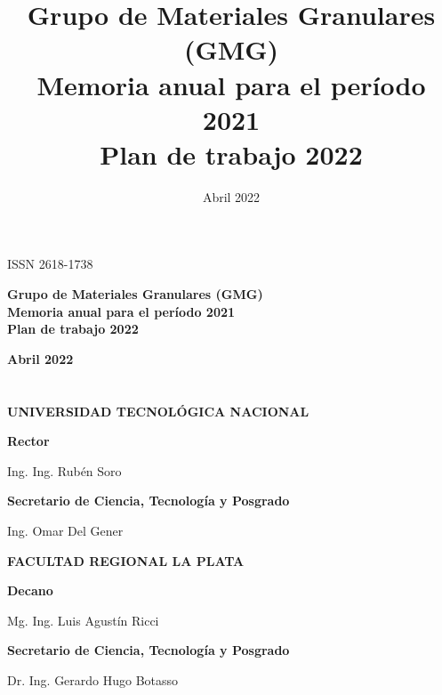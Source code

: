 \documentclass[a4paper,11pt,twoside,final,titlepage,onecolumn,openright]{report}
\begin{document}
\title{Grupo de Materiales Granulares (GMG) \\ Memoria anual para el período 2021 \\ Plan de trabajo 2022}
\date{Abril 2022}


\chapter*{}

\begin{flushright}
 ISSN 2618-1738
\end{flushright}

\vspace{5cm}
\begin{center}

\textbf{\LARGE Grupo de Materiales Granulares (GMG) \\ Memoria anual para el período 2021 \\ Plan de trabajo 2022} 

\vspace{1cm}
\textbf{\Large Abril 2022}
\end{center}


\chapter*{}

\begin{center}

\textbf{\LARGE UNIVERSIDAD TECNOLÓGICA NACIONAL} 

\vspace{1cm}
\textbf{\Large Rector}

Ing. Ing. Rubén Soro

\vspace{0.5cm}
\textbf{\Large Secretario de Ciencia, Tecnología y Posgrado} 

Ing. Omar Del Gener

\vspace{5cm}

\textbf{\LARGE FACULTAD REGIONAL LA PLATA} 

\vspace{1cm}
\textbf{\Large Decano} 

Mg. Ing. Luis Agustín Ricci

\vspace{0.5cm}
\textbf{\Large Secretario de Ciencia, Tecnología y Posgrado}

Dr. Ing. Gerardo Hugo Botasso
 
\end{center}
\end{document}
